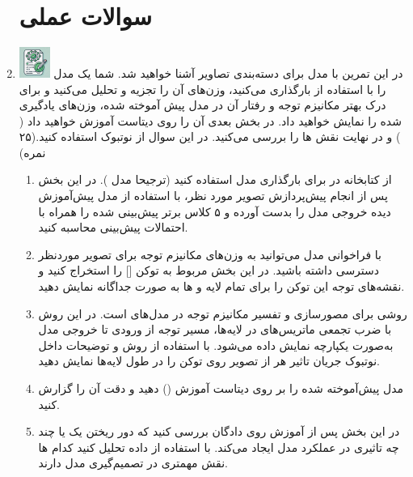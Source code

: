\documentclass[12pt]{article}
\begin{document}
\begin{enumerate}
    	
    \section*{سوالات عملی} 
    \item \includegraphics[width=1cm]{figs/Allowed_with_contributino.jpg}
    در این تمرین با مدل  برای دسته‌بندی تصاویر آشنا خواهید شد. شما یک مدل   را با استفاده از  بارگذاری می‌کنید، وزن‌های  آن را تجزیه و تحلیل می‌کنید و برای درک بهتر مکانیزم توجه و رفتار آن در مدل پیش آموخته شده، وزن‌های یادگیری شده را نمایش خواهید داد. در بخش بعدی آن را روی دیتاست   آموزش خواهید داد ( ) و در نهایت نقش ها را بررسی می‌کنید. در این سوال از نوتبوک  استفاده کنید.(۲۵ نمره)
    \begin{enumerate}
        \item از کتابخانه  در  برای بارگذاری مدل  استفاده کنید (ترجیحا مدل ). در این بخش پس از انجام پیش‌پردازش تصویر مورد نظر، با استفاده از مدل پیش‌آموزش دیده خروجی مدل را بدست آورده و ۵ کلاس برتر پیش‌بینی شده را  همراه با احتمالات پیش‌بینی محاسبه کنید. 
        \item با فراخوانی مدل می‌توانید به وزن‌های مکانیزم توجه برای تصویر مورد‌نظر دسترسی داشته باشید. در این بخش  مربوط به توکن [] را استخراج کنید و نقشه‌های توجه این توکن را برای تمام لایه و ها به صورت جداگانه نمایش دهید.
        \item \href{https://aclanthology.org/2020.acl-main.385.pdf}{} روشی برای مصورسازی و تفسیر مکانیزم توجه در مدل‌های  است. در این روش با ضرب تجمعی ماتریس‌های  در لایه‌ها، مسیر توجه از ورودی تا خروجی مدل به‌صورت یکپارچه نمایش داده می‌شود. با استفاده از روش  و توضیحات داخل نوتبوک جریان تاثیر هر  از تصویر روی توکن  را در طول لایه‌ها نمایش دهید. 
        \item مدل پیش‌آموخته شده را بر روی دیتاست  آموزش () دهید و دقت آن را گزارش کنید. 
        \item در این بخش پس از آموزش روی دادگان بررسی کنید که دور ریختن یک یا چند  چه تاثیری در عملکرد مدل ایجاد می‌کند. با استفاده از داده  تحلیل کنید کدام ها نقش مهمتری در تصمیم‌گیری مدل دارند.  

\end{enumerate}
\end{enumerate}
\end{document}
